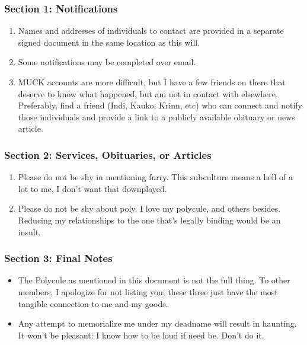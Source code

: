\documentclass[oneside]{memoir}
\begin{document}
\subsubsection*{Section 1: Notifications}\label{section-1-notifications}

\begin{enumerate}
\def\labelenumi{\arabic{enumi}.}
\tightlist
\item
  Names and addresses of individuals to contact are provided in a separate signed document in the same location as this will.
\item
  Some notifications may be completed over email.
\item
  MUCK accounts are more difficult, but I have a few friends on there that deserve to know what happened, but am not in contact with elsewhere. Preferably, find a friend (Indi, Kauko, Krinn, etc) who can connect and notify those individuals and provide a link to a publicly available obituary or news article.
\end{enumerate}

\subsubsection*{Section 2: Services, Obituaries, or Articles}\label{section-2-services-obituaries-or-articles}

\begin{enumerate}
\def\labelenumi{\arabic{enumi}.}
\tightlist
\item
  Please do not be shy in mentioning furry. This subculture means a hell of a lot to me, I don't want that downplayed.
\item
  Please do not be shy about poly. I love my polycule, and others besides. Reducing my relationships to the one that's legally binding would be an insult.
\end{enumerate}

\subsubsection*{Section 3: Final Notes}\label{section-3-final-notes}

\begin{itemize}
\tightlist
\item
  The Polycule as mentioned in this document is not the full thing. To other members, I apologize for not listing you; these three just have the most tangible connection to me and my goods.
\item
  Any attempt to memorialize me under my deadname will result in haunting. It won't be pleasant: I know how to be loud if need be. Don't do it.
\end{itemize}
\end{document}
